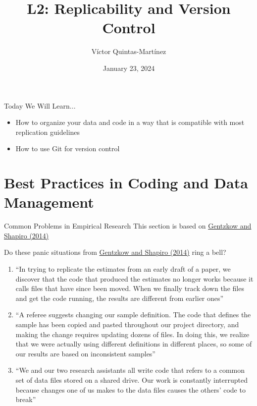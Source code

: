 \documentclass[10pt, aspectratio=169, xcolor=dvipsnames]{beamer}
\title{L2: Replicability and Version Control}
\author{Víctor Quintas-Martínez}
\institute{MIT}
\date{January 23, 2024}
\let\olditem\item
\renewcommand{\item}{%
\olditem\vspace{0.3em}}
\begin{document}
\begin{frame}
\maketitle
\end{frame}

\begin{frame}{Today We Will Learn...}
\begin{itemize}
    \item How to organize your data and code in a way that is compatible with most replication guidelines
    \item How to use Git for version control
\end{itemize}
\end{frame}

\section{Best Practices in Coding and Data Management}
\begin{frame}[t]{Common Problems in Empirical Research}
    \footnotesize This section is based on \href{https://web.stanford.edu/~gentzkow/research/CodeAndData.pdf}{Gentzkow and Shapiro (2014)}

    \normalsize\vspace{0.5em} Do these panic situations from \href{https://web.stanford.edu/~gentzkow/research/CodeAndData.pdf}{Gentzkow and Shapiro (2014)} ring a bell? 
    \begin{enumerate}
        \item ``In trying to replicate the estimates from an early draft of a paper, we discover that the code that produced the estimates no longer works because it calls files that have since been moved. When we finally track down the files and get the code running, the results are different from  earlier ones''
        \item ``A referee suggests changing our sample definition. The code that defines the sample has been copied and pasted throughout our project directory, and making the change requires updating dozens of files. In doing this, we realize that we were actually using different definitions in different places, so some of our results are based on inconsistent samples''
        \item ``We and our two research assistants all write code that refers to a common set of data files stored on a shared drive. Our work is constantly interrupted because changes one of us makes to the data files causes the others' code to break''
    \end{enumerate}
\end{frame}
\end{document}
